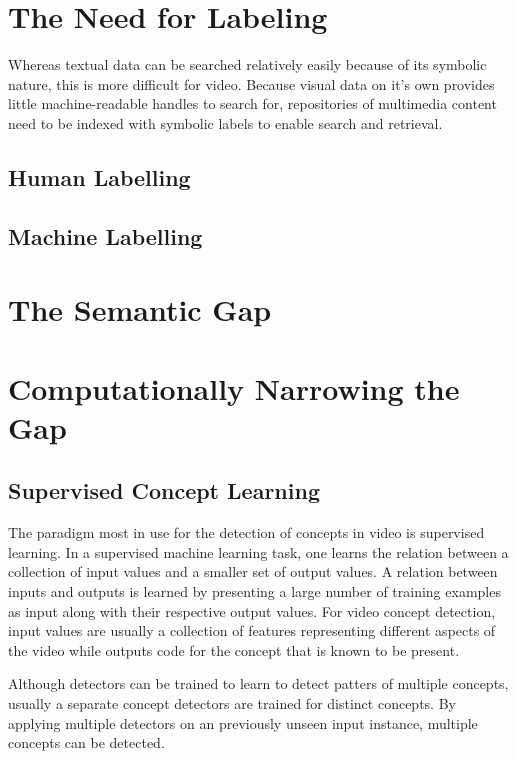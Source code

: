 


\section{The Need for Labeling}

Whereas textual data can be searched relatively easily because of its symbolic nature, this is more difficult for video. Because visual data on it's own provides little machine-readable handles to search for, repositories of multimedia content need to be indexed with symbolic labels to enable search and retrieval. 


\subsection{Human Labelling}

\subsection{Machine Labelling}


\section{The Semantic Gap}


\section{Computationally Narrowing the Gap}

\subsection{Supervised Concept Learning}

The paradigm most in use for the detection of concepts in video is supervised learning. In a supervised machine learning task, one learns the relation between a collection of input values and a smaller set of output values. A relation between inputs and outputs is learned by presenting a large number of training examples as input along with their respective output values. For video concept detection, input values are usually a collection of features representing different aspects of the video while outputs code for the concept that is known to be present. 

Although detectors can be trained to learn to detect patters of multiple concepts, usually a separate concept detectors are trained for distinct concepts. By applying multiple detectors on an previously unseen input instance, multiple concepts can be detected.

